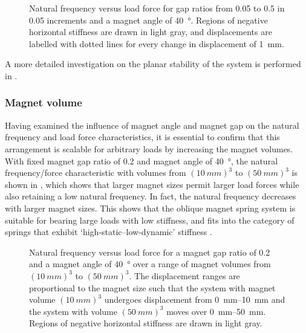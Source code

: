 \documentclass[11pt,a4paper]{memoir}
\begin{document}
\begin{figure}
\centering
{}
\caption{Natural frequency versus load force for gap ratios from \num{0.05} to \num{0.5} in \num{0.05} increments and a magnet angle of \SI{40}{\degree}.
Regions of negative horizontal stiffness are drawn in light gray, and displacements are labelled with dotted lines for every change in displacement of \SI{1}{mm}.}
\end{figure}

A more detailed investigation on the planar stability of the system is performed in .


\subsubsection{Magnet volume}

Having examined the influence of magnet angle and magnet gap on the natural frequency and load force characteristics, it is essential to confirm that this arrangement is scalable for arbitrary loads by increasing the magnet volumes.
With fixed magnet gap ratio of 0.2 and magnet angle of \SI{40}{\degree}, the natural frequency/force characteristic with volumes from $(\SI{10}{mm})^3$ to $(\SI{50}{mm})^3$ is shown in , which shows that larger magnet sizes permit larger load forces while also retaining a low natural frequency.
In fact, the natural frequency decreases with larger magnet sizes.
This shows that the oblique magnet spring system is suitable for bearing large loads with low stiffness, and fits into the category of springs that exhibit `high-static--low-dynamic' stiffness \parencite[e.g.,][]{carrella2008-jsv}.

\begin{figure}
\centering
{}
\caption{Natural frequency versus load force for a magnet gap ratio of \num{0.2} and a magnet angle of \SI{40}{\degree} over a range of magnet volumes from $(\SI{10}{mm})^3$ to $(\SI{50}{mm})^3$.
The displacement ranges are proportional to the magnet size such that the system with magnet volume $(\SI{10}{mm})^3$ undergoes displacement from \SIrange{0}{10}{mm} and the system with volume $(\SI{50}{mm})^3$ moves over \SIrange{0}{50}{mm}.
Regions of negative horizontal stiffness are drawn in light gray.}
\end{figure}
\end{document}
